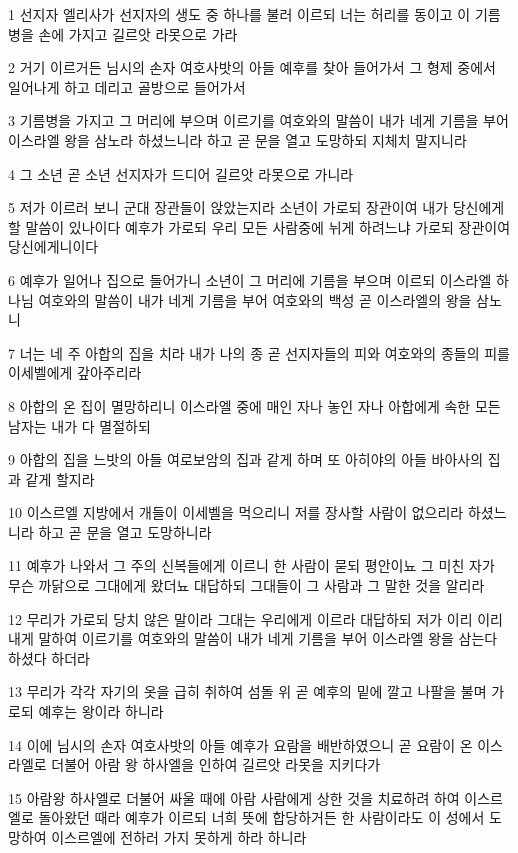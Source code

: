 \par 1 선지자 엘리사가 선지자의 생도 중 하나를 불러 이르되 너는 허리를 동이고 이 기름병을 손에 가지고 길르앗 라못으로 가라
\par 2 거기 이르거든 님시의 손자 여호사밧의 아들 예후를 찾아 들어가서 그 형제 중에서 일어나게 하고 데리고 골방으로 들어가서
\par 3 기름병을 가지고 그 머리에 부으며 이르기를 여호와의 말씀이 내가 네게 기름을 부어 이스라엘 왕을 삼노라 하셨느니라 하고 곧 문을 열고 도망하되 지체치 말지니라
\par 4 그 소년 곧 소년 선지자가 드디어 길르앗 라못으로 가니라
\par 5 저가 이르러 보니 군대 장관들이 앉았는지라 소년이 가로되 장관이여 내가 당신에게 할 말씀이 있나이다 예후가 가로되 우리 모든 사람중에 뉘게 하려느냐 가로되 장관이여 당신에게니이다
\par 6 예후가 일어나 집으로 들어가니 소년이 그 머리에 기름을 부으며 이르되 이스라엘 하나님 여호와의 말씀이 내가 네게 기름을 부어 여호와의 백성 곧 이스라엘의 왕을 삼노니
\par 7 너는 네 주 아합의 집을 치라 내가 나의 종 곧 선지자들의 피와 여호와의 종들의 피를 이세벨에게 갚아주리라
\par 8 아합의 온 집이 멸망하리니 이스라엘 중에 매인 자나 놓인 자나 아합에게 속한 모든 남자는 내가 다 멸절하되
\par 9 아합의 집을 느밧의 아들 여로보암의 집과 같게 하며 또 아히야의 아들 바아사의 집과 같게 할지라
\par 10 이스르엘 지방에서 개들이 이세벨을 먹으리니 저를 장사할 사람이 없으리라 하셨느니라 하고 곧 문을 열고 도망하니라
\par 11 예후가 나와서 그 주의 신복들에게 이르니 한 사람이 묻되 평안이뇨 그 미친 자가 무슨 까닭으로 그대에게 왔더뇨 대답하되 그대들이 그 사람과 그 말한 것을 알리라
\par 12 무리가 가로되 당치 않은 말이라 그대는 우리에게 이르라 대답하되 저가 이리 이리 내게 말하여 이르기를 여호와의 말씀이 내가 네게 기름을 부어 이스라엘 왕을 삼는다 하셨다 하더라
\par 13 무리가 각각 자기의 옷을 급히 취하여 섬돌 위 곧 예후의 밑에 깔고 나팔을 불며 가로되 예후는 왕이라 하니라
\par 14 이에 님시의 손자 여호사밧의 아들 예후가 요람을 배반하였으니 곧 요람이 온 이스라엘로 더불어 아람 왕 하사엘을 인하여 길르앗 라못을 지키다가
\par 15 아람왕 하사엘로 더불어 싸울 때에 아람 사람에게 상한 것을 치료하려 하여 이스르엘로 돌아왔던 때라 예후가 이르되 너희 뜻에 합당하거든 한 사람이라도 이 성에서 도망하여 이스르엘에 전하러 가지 못하게 하라 하니라
